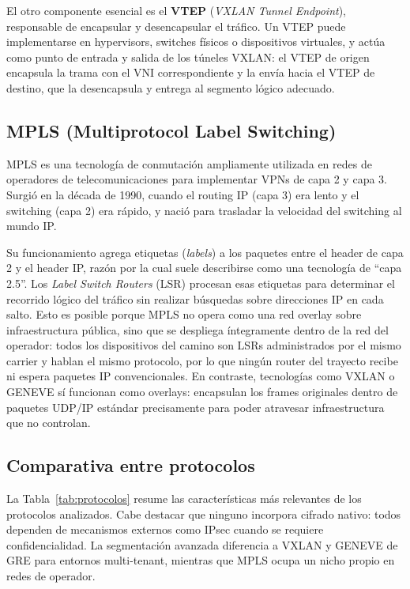 El otro componente esencial es el \textbf{VTEP} (\textit{VXLAN Tunnel Endpoint}), responsable de encapsular y desencapsular el tráfico. Un VTEP puede implementarse en hypervisors, switches físicos o dispositivos virtuales, y actúa como punto de entrada y salida de los túneles VXLAN: el VTEP de origen encapsula la trama con el VNI correspondiente y la envía hacia el VTEP de destino, que la desencapsula y entrega al segmento lógico adecuado.


\subsection{MPLS (Multiprotocol Label Switching)}

MPLS es una tecnología de conmutación ampliamente utilizada en redes de operadores de telecomunicaciones para implementar VPNs de capa 2 y capa 3. Surgió en la década de 1990, cuando el routing IP (capa 3) era lento y el switching (capa 2) era rápido, y nació para trasladar la velocidad del switching al mundo IP.

Su funcionamiento agrega etiquetas (\textit{labels}) a los paquetes entre el header de capa 2 y el header IP, razón por la cual suele describirse como una tecnología de ``capa 2.5''. Los \textit{Label Switch Routers} (LSR) procesan esas etiquetas para determinar el recorrido lógico del tráfico sin realizar búsquedas sobre direcciones IP en cada salto. Esto es posible porque MPLS no opera como una red overlay sobre infraestructura pública, sino que se despliega íntegramente dentro de la red del operador: todos los dispositivos del camino son LSRs administrados por el mismo carrier y hablan el mismo protocolo, por lo que ningún router del trayecto recibe ni espera paquetes IP convencionales. En contraste, tecnologías como VXLAN o GENEVE sí funcionan como overlays: encapsulan los frames originales dentro de paquetes UDP/IP estándar precisamente para poder atravesar infraestructura que no controlan.

\subsection{Comparativa entre protocolos}

La Tabla~\ref{tab:protocolos} resume las características más relevantes de los protocolos analizados. Cabe destacar que ninguno incorpora cifrado nativo: todos dependen de mecanismos externos como IPsec cuando se requiere confidencialidad. La segmentación avanzada diferencia a VXLAN y GENEVE de GRE para entornos multi-tenant, mientras que MPLS ocupa un nicho propio en redes de operador.


